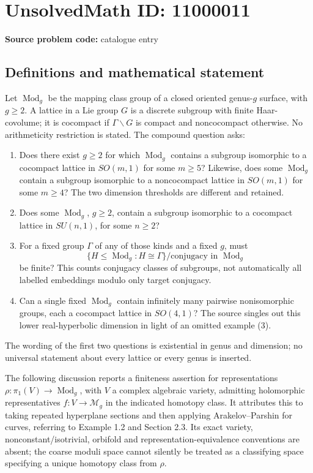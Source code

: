 \documentclass[11pt]{article}
\begin{document}
\section*{UnsolvedMath ID: 11000011}
\textbf{Source problem code:} catalogue entry
\subsection{Definitions and mathematical statement}
Let \(\operatorname{Mod}_g\) be the mapping class group of a closed oriented genus-\(g\) surface, with \(g\geq2\). A lattice in a Lie group \(G\) is a discrete subgroup with finite Haar-covolume; it is cocompact if \(\Gamma\backslash G\) is compact and noncocompact otherwise. No arithmeticity restriction is stated. The compound question asks:
\begin{enumerate}
\item Does there exist \(g\geq2\) for which \(\operatorname{Mod}_g\) contains a subgroup isomorphic to a cocompact lattice in \(SO(m,1)\) for some \(m\geq5\)? Likewise, does some \(\operatorname{Mod}_g\) contain a subgroup isomorphic to a noncocompact lattice in \(SO(m,1)\) for some \(m\geq4\)? The two dimension thresholds are different and retained.
\item Does some \(\operatorname{Mod}_g\), \(g\geq2\), contain a subgroup isomorphic to a cocompact lattice in \(SU(n,1)\), for some \(n\geq2\)?
\item For a fixed group \(\Gamma\) of any of those kinds and a fixed \(g\), must
\[\{H\leq\operatorname{Mod}_g:H\cong\Gamma\}/\text{conjugacy in }\operatorname{Mod}_g\]
be finite? This counts conjugacy classes of subgroups, not automatically all labelled embeddings modulo only target conjugacy.
\item Can a single fixed \(\operatorname{Mod}_g\) contain infinitely many pairwise nonisomorphic groups, each a cocompact lattice in \(SO(4,1)\)? The source singles out this lower real-hyperbolic dimension in light of an omitted example (3).
\end{enumerate}
The wording of the first two questions is existential in genus and dimension; no universal statement about every lattice or every genus is inserted.

The following discussion reports a finiteness assertion for representations \(\rho:\pi_1(V)\to\operatorname{Mod}_g\), with \(V\) a complex algebraic variety, admitting holomorphic representatives \(f:V\to\mathcal M_g\) in the indicated homotopy class. It attributes this to taking repeated hyperplane sections and then applying Arakelov--Parshin for curves, referring to Example 1.2 and Section 2.3. Its exact variety, nonconstant/isotrivial, orbifold and representation-equivalence conventions are absent; the coarse moduli space cannot silently be treated as a classifying space specifying a unique homotopy class from \(\rho\).
\end{document}
